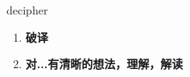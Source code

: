 
\begin{frame}
{\huge decipher}
\begin{center}
\begin{enumerate}\Large
  \item \textbf{破译}
  \item \textbf{对...有清晰的想法，理解，解读}
\end{enumerate}
\end{center}
\end{frame}

